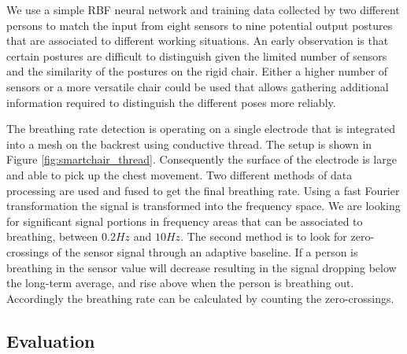 We use a simple RBF neural network and training data collected by two different persons to match the input from eight sensors to nine potential output postures that are associated to different working situations. An early observation is that certain postures are difficult to distinguish given the limited number of sensors and the similarity of the postures on the rigid chair. Either a higher number of sensors or a more versatile chair could be used that allows gathering additional information required to distinguish the different poses more reliably. 

The breathing rate detection is operating on a single electrode that is integrated into a mesh on the backrest using conductive thread. The setup is shown in Figure \ref{fig:smartchair_thread}. Consequently the surface of the electrode is large and able to pick up the chest movement. Two different methods of data processing are used and fused to get the final breathing rate. Using a fast Fourier transformation the signal is transformed into the frequency space. We are looking for significant signal portions in frequency areas that can be associated to breathing, between $0.2Hz$ and $10Hz$. The second method is to look for zero-crossings of the sensor signal through an adaptive baseline. If a person is breathing in the sensor value will decrease resulting in the signal dropping below the long-term average, and rise above when the person is breathing out. Accordingly the breathing rate can be calculated by counting the zero-crossings.
\subsection{Evaluation}
